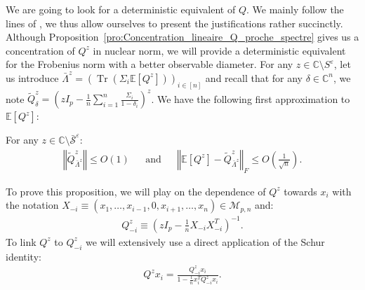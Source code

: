 \documentclass{ws-rmta}
\DeclareMathOperator{\tr}{Tr}
\begin{document}
We are going to look for a deterministic equivalent of $Q$. We mainly follow the lines of \cite{LOU21RHL}, we thus allow ourselves to present the justifications rather succinctly. Although Proposition~\ref{pro:Concentration_lineaire_Q_proche_spectre} gives us a concentration of $Q^z$ in nuclear norm, we will provide a deterministic equivalent for the Frobenius norm with a better observable diameter. 
For any $z \in \mathbb C \setminus S^\varepsilon$, let us introduce $\bar \Lambda^z = (\tr(\Sigma_i\mathbb E[Q^z]))_{i \in [n]}$ and recall that for any $\delta \in \mathbb C^n$, we note $\tilde Q_\delta^z = (zI_p - \frac{1}{n} \sum_{i=1}^n \frac{\Sigma_i}{1-\delta_i})^z $. We have the following first approximation to $\mathbb E[Q^z]$:
\begin{proposition}\label{pro:first_deterministic_equivalent}
  For any $z \in \mathbb C \setminus \bar{\mathcal S}^\varepsilon$:
  \begin{align*}
    \left\Vert \tilde Q^z_{\bar \Lambda^z} \right\Vert \leq O(1)&
    &\text{and}&
    &\left\Vert \mathbb E[Q^z] - \tilde Q^z_{\bar \Lambda^z} \right\Vert_F \leq O \left( \frac{1}{\sqrt n} \right).
  \end{align*}
\end{proposition}
To prove this proposition, we will play on the dependence of $Q^z$ towards $x_i$ with the notation $X_{-i} \equiv (x_1, \ldots, x_{i-1}, 0, x_{i+1}, \ldots, x_n) \in \mathcal{M}_{p,n}$ and:
\begin{align*}
  Q_{-i}^z \equiv \left( zI_p - \frac{1}{n}X_{-i}X_{-i}^T \right)^{-1}.
\end{align*}
To link $Q^z$ to $Q^z_{-i}$ we will extensively use a direct application of the Schur identity:
\begin{align}\label{eq:Schur_identity}
   Q^zx_i = \frac{Q^z_{-i}x_i}{1 - \frac{1}{n}x_i^T Q^z_{-i}x_i}.
 \end{align} 
\end{document}
